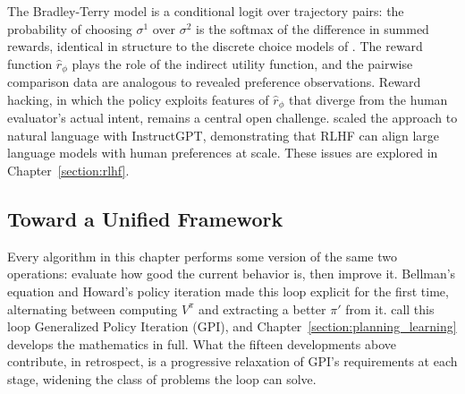The Bradley-Terry model is a conditional logit over trajectory pairs: the probability of choosing $\sigma^1$ over $\sigma^2$ is the softmax of the difference in summed rewards, identical in structure to the discrete choice models of \citet{McFadden1974}. The reward function $\hat{r}_\phi$ plays the role of the indirect utility function, and the pairwise comparison data are analogous to revealed preference observations. Reward hacking, in which the policy exploits features of $\hat{r}_\phi$ that diverge from the human evaluator's actual intent, remains a central open challenge. \citet{Ouyang2022} scaled the approach to natural language with InstructGPT, demonstrating that RLHF can align large language models with human preferences at scale. These issues are explored in Chapter~\ref{section:rlhf}.

\subsection{Toward a Unified Framework}

Every algorithm in this chapter performs some version of the same two operations: evaluate how good the current behavior is, then improve it. Bellman's equation and Howard's policy iteration made this loop explicit for the first time, alternating between computing $V^\pi$ and extracting a better $\pi'$ from it. \citet{sutton2018} call this loop Generalized Policy Iteration (GPI), and Chapter~\ref{section:planning_learning} develops the mathematics in full. What the fifteen developments above contribute, in retrospect, is a progressive relaxation of GPI's requirements at each stage, widening the class of problems the loop can solve.

